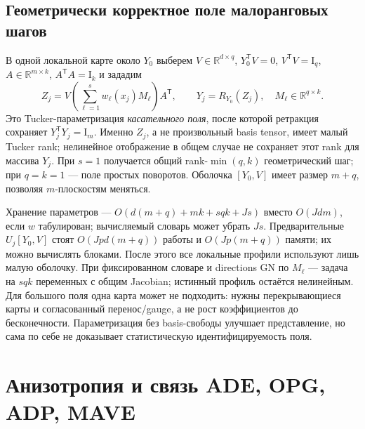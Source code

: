 \documentclass[11pt,a4paper]{article}
\newcommand{\R}{\mathbb R}
\newcommand{\Id}{\mathrm I}
\newcommand{\T}{^{\mathsf T}}
\begin{document}
\subsection{Геометрически корректное поле малоранговых шагов}
В одной локальной карте около $Y_0$ выберем
$V\in\R^{d\times q}$, $Y_0\T V=0$, $V\T V=\Id_q$,
$A\in\R^{m\times k}$, $A\T A=\Id_k$ и зададим
\begin{equation}\label{eq:tangentfield}
 Z_j=V\left(\sum_{\ell=1}^s w_\ell(x_j)M_\ell\right)A\T,
 \qquad Y_j=R_{Y_0}(Z_j),\quad M_\ell\in\R^{q\times k}.
\end{equation}
Это Tucker-параметризация \emph{касательного поля}, после которой
ретракция сохраняет $Y_j\T Y_j=\Id_m$.
Именно $Z_j$, а не произвольный basis tensor, имеет малый Tucker rank;
нелинейное отображение в общем случае не сохраняет этот rank для массива $Y_j$.
При $s=1$ получается общий rank-$\min(q,k)$ геометрический шаг;
при $q=k=1$ --- поле простых поворотов.
Оболочка $[Y_0,V]$ имеет размер $m+q$, позволяя $m$-плоскостям меняться.

Хранение параметров --- $O(d(m+q)+mk+sqk+Js)$ вместо $O(Jdm)$,
если $w$ табулирован; вычисляемый словарь может убрать $Js$.
Предварительные $U_j[Y_0,V]$ стоят $O(Jpd(m+q))$ работы
и $O(Jp(m+q))$ памяти; их можно вычислять блоками.
После этого все локальные профили используют лишь малую оболочку.
При фиксированном словаре и directions GN по $M_\ell$ --- задача
на $sqk$ переменных с общим Jacobian; истинный профиль остаётся нелинейным.
Для большого поля одна карта может не подходить: нужны перекрывающиеся
карты и согласованный перенос/gauge, а не рост коэффициентов до бесконечности.
Параметризация без basis-свободы улучшает представление, но сама по себе
не доказывает статистическую идентифицируемость поля.

\section{Анизотропия и связь ADE, OPG, ADP, MAVE}\label{sec:metrics}
\end{document}
